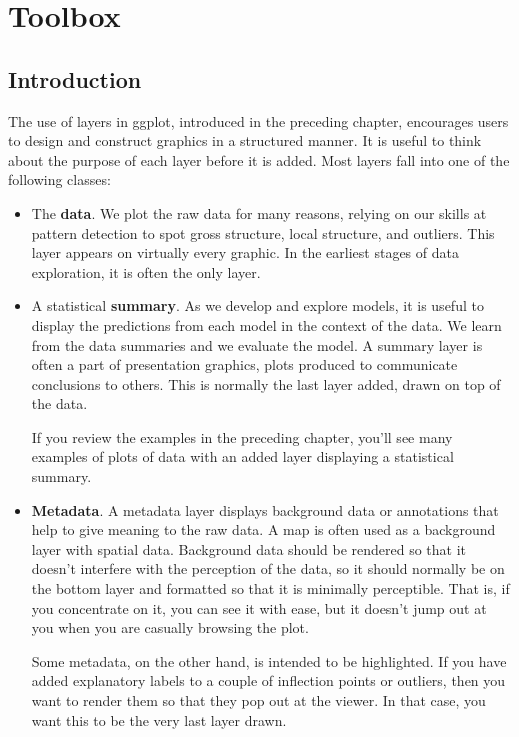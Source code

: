 

% 


\chapter{Toolbox}
\label{cha:toolbox}

\section{Introduction}\label{sec:introduction}

The use of layers in ggplot, introduced in the preceding chapter, encourages users to design and construct graphics in a structured manner.  It is useful to think about the purpose of each layer before it is added.  Most layers fall into one of the following classes:

\begin{itemize}
  \item The {\bf data}.  We plot the raw data for many reasons, relying on our skills at pattern detection to spot gross structure, local structure, and outliers.  This layer appears on virtually every graphic.  In the earliest stages of data exploration, it is often the only layer.

  \item A statistical {\bf summary}.  As we develop and explore models, it is useful to display the predictions from each model in the context of the data.  We learn from the data summaries and we evaluate the model.  A summary layer is often a part of presentation graphics, plots produced to communicate conclusions to others.
 This is normally the last layer added, drawn on top of the data.

  If you review the examples in the preceding chapter, you'll see many examples of plots of data with an added layer displaying a statistical summary.

  \item {\bf Metadata}.  A metadata layer displays background data or annotations that help to give meaning to the raw data.  A map is often used as a background layer with spatial data.  Background data should be rendered so that it doesn't interfere with the perception of the data, so it should normally be on the bottom layer and formatted so that it is minimally perceptible.  That is, if you concentrate on it, you can see it with ease, but it doesn't jump out at you when you are casually browsing the plot.

  Some metadata, on the other hand, is intended to be highlighted.  If you have added explanatory labels to a couple of inflection points or outliers, then you want to render them so that they pop out at the viewer.  In that case, you want this to be the very last layer drawn.
  
\end{itemize}


